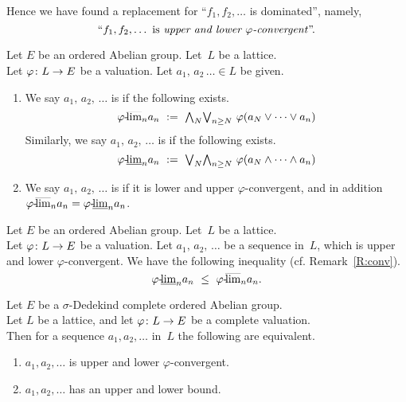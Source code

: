 \documentclass[main.tex]{subfiles}
\begin{document}
Hence we have found a replacement 
for ``$f_1,f_2,\dotsc$ is dominated'',
namely,
\begin{equation*}
\text{``$f_1,f_2,\dotsc$ is \emph{upper and lower $\varphi$-convergent}''.}
\end{equation*}
%
%
\begin{dfn}
\label{D:seq-phi-conv}
Let $E$ be an ordered Abelian group.
Let~$L$ be a lattice.\\
Let $\varphi\colon L \rightarrow E$ be a valuation.
Let $a_1,\, a_2\, \dotsc\in L$ be given.
\begin{enumerate}
\item
We say $a_1,\,a_2,\, \dotsc$
is 
if the following exists.
\begin{equation*}
\pulim\varphi{n}a_n \ \eqdf\ 
\bw_N \bv_{n\geq N}\ \varphi(a_N\vee\dotsb\vee a_n)
\end{equation*}
Similarly,
we say $a_1,\,a_2,\,\dotsc$ is  if
the following exists.
\begin{equation*}
\pllim\varphi{n}a_n \ \eqdf\ 
\bv_N \bw_{n\geq N}\ \varphi(a_N\wedge\dotsb\wedge a_n)
\end{equation*}

\item
We say $a_1,\,a_2,\,\dotsc$
is 
if it is lower and upper $\varphi$-convergent,
and in addition ${\varphi}\text{-}\!\smash{\overline{\lim}_{n}}a_n = {\varphi}\text{-}\!\smash{\underline{\lim}_{n}}a_n$.
\end{enumerate}
\end{dfn}
%
%
\begin{rem}
\label{R:seq-phi-conv}
Let $E$ be an ordered Abelian group.
Let~$L$ be a lattice.\\
Let $\varphi\colon L \rightarrow E$ be a valuation.
Let $a_1,\,a_2,\,\dotsc$ be a sequence in~$L$,
which is upper and lower $\varphi$-convergent.
We have the following inequality
(cf. Remark~\ref{R:conv}).
\begin{equation*}
\pllim\varphi{n}a_n \ \leq\ \pulim\varphi{n}a_n.
\end{equation*}
\end{rem}
%
%
\begin{prop}
\label{P:phi-conv-dom-2}
Let $E$ be a $\sigma$-Dedekind complete
ordered Abelian group.\\
Let $L$ be a lattice,
and let $\varphi\colon L\rightarrow E$ 
be a complete valuation.\\
Then for a sequence $a_1,a_2,\dotsc$ in~$L$
the following are equivalent.
\begin{enumerate}
\item
\label{P:phi-conv-dom-2_1}
$a_1,a_2,\dotsc$ is upper and lower $\varphi$-convergent.
\item
\label{P:phi-conv-dom-2_2}
$a_1,a_2,\dotsc$ has an upper and lower bound.
\end{enumerate}
\end{prop}
\end{document}
